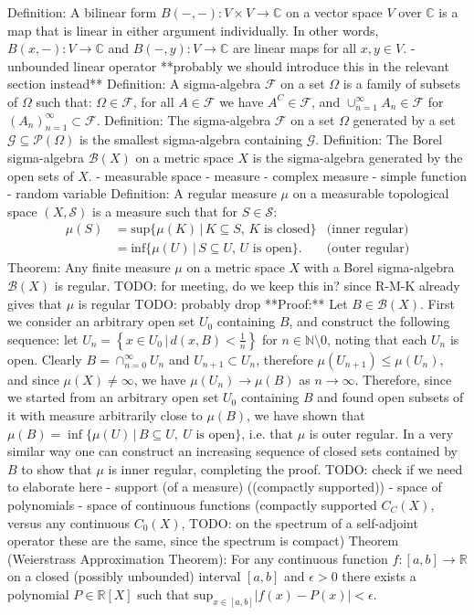\documentclass[12pt,oneside]{report}
\begin{document}
 Definition: A bilinear form $B(-,-): V \times V \to \mathbb{C}$ on a vector space $V$ over $\mathbb{C}$ is a map that is linear in either argument individually. In other words, $B(x,-): V \to \mathbb{C}$ and $B(-,y): V \to \mathbb{C}$ are linear maps for all $x,y \in V$.
- unbounded linear operator **probably we should introduce this in the relevant section instead**
 Definition: A sigma-algebra $\mathcal{F}$ on a set $\Omega$ is a family of subsets of $\Omega$ such that: $\Omega \in \mathcal{F}$, for all $A \in \mathcal{F}$ we have $A^{C} \in \mathcal{F}$, and $\cup_{n=1}^{\infty} A_{n} \in \mathcal{F}$ for $(A_{n})_{n=1}^{\infty} \subset \mathcal{F}$.
 Definition: The sigma-algebra $\mathcal{F}$ on a set $\Omega$ generated by a set $\mathcal{G} \subseteq \mathcal{P(\Omega)}$ is the smallest sigma-algebra containing $\mathcal{G}$.
 Definition: The Borel sigma-algebra $\mathcal{B}(X)$ on a metric space $X$ is the sigma-algebra generated by the open sets of $X$.
- measurable space
- measure
- complex measure
- simple function
- random variable
 Definition: A regular measure $\mu$ on a measurable topological space $(X, \mathcal{S})$ is a measure such that for $S \in \mathcal{S}$:\begin{align}
\mu(S) &= \text{sup} \{ \mu(K) \, | \, K \subseteq S, \, K \text{ is closed} \} & \text{(inner regular)} \\
&= \text{inf} \{ \mu(U) \, | \, S \subseteq U, \, U \text{ is open} \}. & \text{(outer regular)}
\end{align}
 Theorem: Any finite measure $\mu$ on a metric space $X$ with a Borel sigma-algebra $\mathcal{B}(X)$ is regular. TODO: for meeting, do we keep this in? since R-M-K already gives that $\mu$ is regular TODO: probably drop
**Proof:** Let $B \in \mathcal{B}(X)$. First we consider an arbitrary open set $U_{0}$ containing $B$, and construct the following sequence: let $U_{n} = \left\{  x \in U_{0} \, | \, d(x,B) < \frac{1}{n}  \right\}$ for $n \in \mathbb{N} \setminus 0$, noting that each $U_{n}$ is open. Clearly $B = \cap_{n=0}^{\infty} U_{n}$ and $U_{n+1} \subset U_{n}$, therefore $\mu(U_{n+1}) \leq \mu(U_{n})$, and since $\mu(X) \neq \infty$, we have $\mu(U_{n}) \to \mu(B)$ as $n \to \infty$. Therefore, since we started from an arbitrary open set $U_{0}$ containing $B$ and found open subsets of it with measure arbitrarily close to $\mu(B)$, we have shown that $\mu(B) = \inf\{ \mu(U) \, | \, B \subseteq U, \ U \text{ is open} \}$, i.e. that $\mu$ is outer regular. In a very similar way one can construct an increasing sequence of closed sets contained by $B$ to show that $\mu$ is inner regular, completing the proof. TODO: check if we need to elaborate here
- support (of a measure) ((compactly supported))
- space of polynomials
- space of continuous functions (compactly supported $C_{C}(X)$, versus any continuous $C_{0}(X)$, TODO: on the spectrum of a self-adjoint operator these are the same, since the spectrum is compact)
 Theorem (Weierstrass Approximation Theorem): For any continuous function $f: [a,b] \to \mathbb{R}$ on a closed (possibly unbounded) interval $[a,b]$ and $\epsilon > 0$ there exists a polynomial $P \in \mathbb{R}[X]$ such that $\text{sup}_{x \in [a,b]}|f(x) - P(x)| < \epsilon$.
\end{document}
